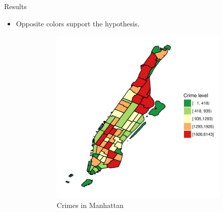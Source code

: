 \documentclass[10pt,ignorenonframetext,]{beamer}
\providecommand{\tightlist}{%
  \setlength{\itemsep}{0pt}\setlength{\parskip}{0pt}}
\begin{document}
\begin{frame}{%
\protect\hypertarget{results}{%
Results}}

\begin{itemize}
\tightlist
\item
  Opposite colors support the hypothesis.

  \begin{figure}
  \label{fig:zones}
    \centering
    \begin{subfigure}[t]{0.45\textwidth}
        \centering
        \label{fig:zones_shape}
        \includegraphics[width=1\textwidth]{../img/crimes_per_zone_2015_Manhattan}
        \caption{Crimes in Manhattan}
    \end{subfigure}%
    ~ 
    \begin{subfigure}[t]{0.45\textwidth}
        \centering
        \label{fig:zones_raster}

\end{subfigure}
\end{figure}
\end{itemize}
\end{frame}
\end{document}
